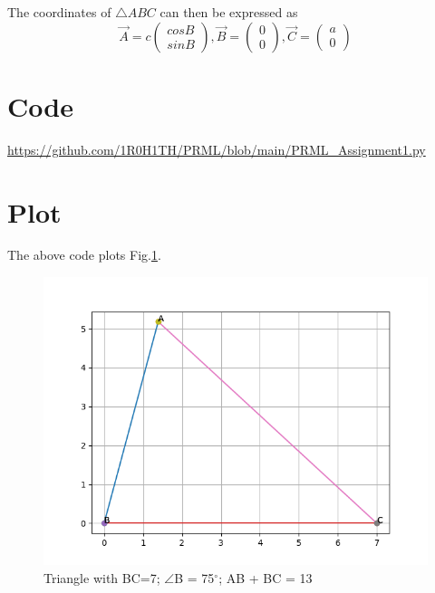 \documentclass[letterpaper,12pt]{article}
\begin{document}
The coordinates of $\triangle ABC$ can then be expressed as
    \begin{equation}
        \Vec{A} = c
        \begin{pmatrix}
            cos B \\
            sin B
        \end{pmatrix},
        \Vec{B} =
        \begin{pmatrix}
            0 \\
            0
        \end{pmatrix},
        \Vec{C} = 
        \begin{pmatrix}
            a \\
            0
        \end{pmatrix}
    \end{equation}
\section{Code}
\url{https://github.com/1R0H1TH/PRML/blob/main/PRML_Assignment1.py}
\section{Plot}
The above code plots Fig.\ref{fig:direction_vectors}.
\begin{figure}[!ht]
\centering
\includegraphics[width=0.75\columnwidth]{Figure_1.png}
\caption{Triangle with BC=7; $\angle$B = 75$^{\circ}$; AB + BC = 13}
\label{fig:direction_vectors}
\end{figure}
\end{document}
